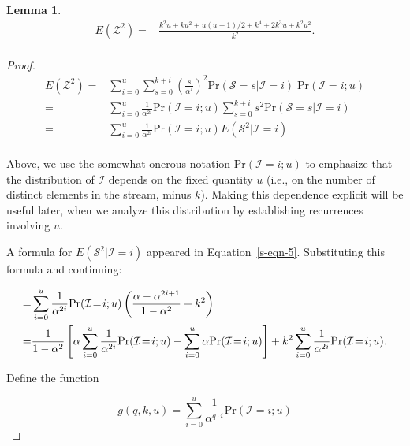 \documentclass{article}
\newtheorem{lemma}[theorem]{Lemma}
\begin{document}
\begin{lemma}\label{lemma:e-z-sq}
\begin{align*}
E(\mathcal{Z}^2) = & \frac{k^2u + ku^2 + u(u\!-\!1)/2 + k^4 + 2k^3u + k^2u^2}{k^2}. \\
\end{align*}
\end{lemma}
\begin{proof}
\begin{align*}
E(\mathcal{Z}^2) 
= & \sum_{i=0}^u \sum_{s=0}^{k+i} \left( \frac{s}{\alpha^i} \right)^2 
    \mathrm{Pr}(\mathcal{S}\!=\!s| \mathcal{I}=i) \; \mathrm{Pr}(\mathcal{I}\!=\!i;u) \\
= & \sum_{i=0}^u \frac{1}{\alpha^{2i}} 
\mathrm{Pr}(\mathcal{I}\!=\!i;u)
\sum_{s=0}^{k+i} s^2 
\mathrm{Pr}(\mathcal{S}\!=\!s| \mathcal{I}=i) \\
= & \sum_{i=0}^u \frac{1}{\alpha^{2i}} 
\mathrm{Pr}(\mathcal{I}\!=\!i;u)
E(\mathcal{S}^2| \mathcal{I}=i) \\
\end{align*}

Above, we use the somewhat onerous notation $\mathrm{Pr}(\mathcal{I}\!=\!i;u)$ to emphasize that the distribution
of $\mathcal{I}$ depends on the fixed quantity $u$ (i.e., on the number of distinct elements in the stream, minus $k$). Making this dependence explicit
will be useful later, when we analyze this distribution by establishing recurrences involving $u$.

A formula for $E(\mathcal{S}^2|\mathcal{I}=i)$ appeared in Equation~\eqref{s-eqn-5}. 
Substituting this formula and continuing:

\begin{align}
= & \sum_{i=0}^u \frac{1}{\alpha^{2i}} 
\mathrm{Pr}(\mathcal{I}\!=\!i;u) \notag
\left(  \frac{\alpha-\alpha^{2i+1}}{1-\alpha^2} + k^2  \right) \\
= & \label{bigexpression} \frac{1}{1-\alpha^2} 
\left[
\alpha \sum_{i=0}^u \frac{1}{\alpha^{2i}} \mathrm{Pr}(\mathcal{I}\!=\!i;u) -
\sum_{i=0}^u \alpha \mathrm{Pr}(\mathcal{I}\!=\!i;u)
\right] + k^2 \sum_{i=0}^u \frac{1}{\alpha^{2i}} \mathrm{Pr}(\mathcal{I}\!=\!i;u).
 \end{align}
 

Define the function

\begin{equation} \label{gdef}
g(q,k,u) = \sum_{i=0}^u \frac{1}{\alpha^{q \cdot i}} \mathrm{Pr}(\mathcal{I}\!=\!i;u)
\end{equation}


\end{proof}
\end{document}

